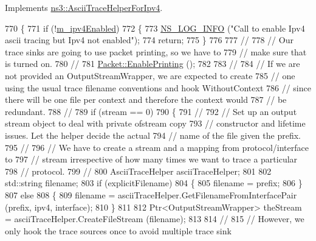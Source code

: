 Implements \hyperlink{classns3_1_1AsciiTraceHelperForIpv4_afe9e8a865d66140f0b2b42b5381b437d}{ns3\+::\+Ascii\+Trace\+Helper\+For\+Ipv4}.


\begin{DoxyCode}
770 \{
771   \textcolor{keywordflow}{if} (!\hyperlink{classns3_1_1InternetStackHelper_a52b041bc6e084a821e6885c71d38df31}{m\_ipv4Enabled})
772     \{
773       \hyperlink{group__logging_gafbd73ee2cf9f26b319f49086d8e860fb}{NS\_LOG\_INFO} (\textcolor{stringliteral}{"Call to enable Ipv4 ascii tracing but Ipv4 not enabled"});
774       \textcolor{keywordflow}{return};
775     \}
776 
777   \textcolor{comment}{//}
778   \textcolor{comment}{// Our trace sinks are going to use packet printing, so we have to }
779   \textcolor{comment}{// make sure that is turned on.}
780   \textcolor{comment}{//}
781   \hyperlink{classns3_1_1Packet_ae17c0cd8e63e83df3c9273801e3d5d7f}{Packet::EnablePrinting} ();
782 
783   \textcolor{comment}{//}
784   \textcolor{comment}{// If we are not provided an OutputStreamWrapper, we are expected to create }
785   \textcolor{comment}{// one using the usual trace filename conventions and hook WithoutContext}
786   \textcolor{comment}{// since there will be one file per context and therefore the context would}
787   \textcolor{comment}{// be redundant.}
788   \textcolor{comment}{//}
789   \textcolor{keywordflow}{if} (stream == 0)
790     \{
791       \textcolor{comment}{//}
792       \textcolor{comment}{// Set up an output stream object to deal with private ofstream copy }
793       \textcolor{comment}{// constructor and lifetime issues.  Let the helper decide the actual}
794       \textcolor{comment}{// name of the file given the prefix.}
795       \textcolor{comment}{//}
796       \textcolor{comment}{// We have to create a stream and a mapping from protocol/interface to }
797       \textcolor{comment}{// stream irrespective of how many times we want to trace a particular }
798       \textcolor{comment}{// protocol.}
799       \textcolor{comment}{//}
800       AsciiTraceHelper asciiTraceHelper;
801 
802       std::string filename;
803       \textcolor{keywordflow}{if} (explicitFilename)
804         \{
805           filename = prefix;
806         \}
807       \textcolor{keywordflow}{else}
808         \{
809           filename = asciiTraceHelper.GetFilenameFromInterfacePair (prefix, ipv4, interface);
810         \}
811 
812       Ptr<OutputStreamWrapper> theStream = asciiTraceHelper.CreateFileStream (filename);
813 
814       \textcolor{comment}{//}
815       \textcolor{comment}{// However, we only hook the trace sources once to avoid multiple trace sink}

\end{DoxyCode}

